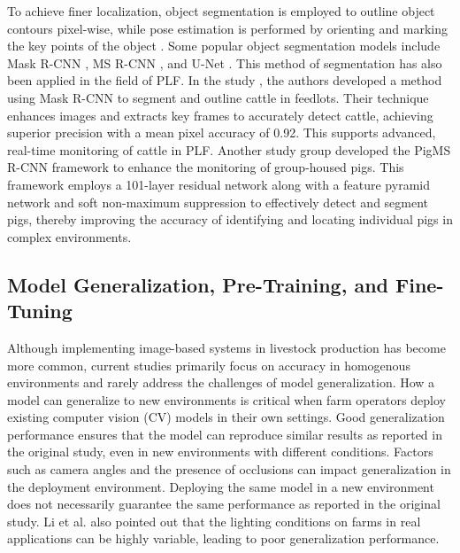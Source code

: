 To achieve finer localization, object segmentation is employed to outline object contours pixel-wise, while pose estimation is performed by orienting and marking the key points of the object \cite{hariharan2015hypercolumns}. Some popular object segmentation models include Mask R-CNN \cite{he2017mask}, MS R-CNN \cite{huang2019mask}, and U-Net \cite{siddique2021u}. This method of segmentation has also been applied in the field of PLF. In the study \cite{noe2022automatic}, the authors developed a method using Mask R-CNN \cite{he2017mask} to segment and outline cattle in feedlots. Their technique enhances images and extracts key frames to accurately detect cattle, achieving superior precision with a mean pixel accuracy of 0.92. This supports advanced, real-time monitoring of cattle in PLF. Another study group \cite{tu2021automatic} developed the PigMS R-CNN framework \cite{huang2019mask} to enhance the monitoring of group-housed pigs. This framework employs a 101-layer residual network along with a feature pyramid network and soft non-maximum suppression to effectively detect and segment pigs, thereby improving the accuracy of identifying and locating individual pigs in complex environments.

\subsection*{Model Generalization, Pre-Training, and Fine-Tuning}

Although implementing image-based systems in livestock production has become more common, current studies primarily focus on accuracy in homogenous environments and rarely address the challenges of model generalization. How a model can generalize to new environments is critical when farm operators deploy existing computer vision (CV) models in their own settings. Good generalization performance ensures that the model can reproduce similar results as reported in the original study, even in new environments with different conditions. Factors such as camera angles and the presence of occlusions can impact generalization in the deployment environment. Deploying the same model in a new environment does not necessarily guarantee the same performance as reported in the original study. Li et al. \cite{li2021practices} also pointed out that the lighting conditions on farms in real applications can be highly variable, leading to poor generalization performance.

